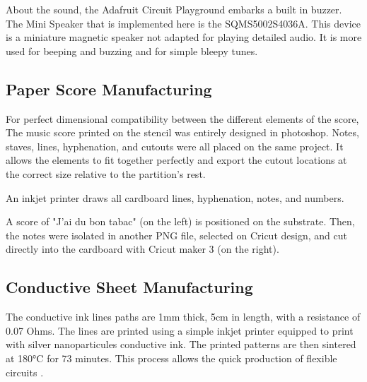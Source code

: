 About the sound, the Adafruit Circuit Playground embarks a built in buzzer. The Mini Speaker that is implemented here is the SQMS5002S4036A. This device is a miniature magnetic speaker not adapted for playing detailed audio. It is more used for beeping and buzzing and for simple bleepy tunes. 


\subsection{Paper Score Manufacturing}

For perfect dimensional compatibility between the different elements of the score, The music score printed on the stencil was entirely designed in photoshop. Notes, staves, lines, hyphenation, and cutouts were all placed on the same project. It allows the elements to fit together perfectly and export the cutout locations at the correct size relative to the partition's rest.

An inkjet printer draws all cardboard lines, hyphenation, notes, and numbers.

A score of "J'ai du bon tabac" (on the left) is positioned on the substrate. Then, the notes were isolated in another PNG file, selected on Cricut design, and cut directly into the cardboard with Cricut maker 3 (on the right).


\subsection{Conductive Sheet Manufacturing}

The conductive ink lines paths are 1mm thick, 5cm in length, with a resistance of 0.07 Ohms. The lines are printed using a simple inkjet printer equipped to print with silver nanoparticules conductive ink. The printed patterns are then sintered at 180°C for 73 minutes. This process allows the quick production of flexible circuits \cite{khan2019soft}.

